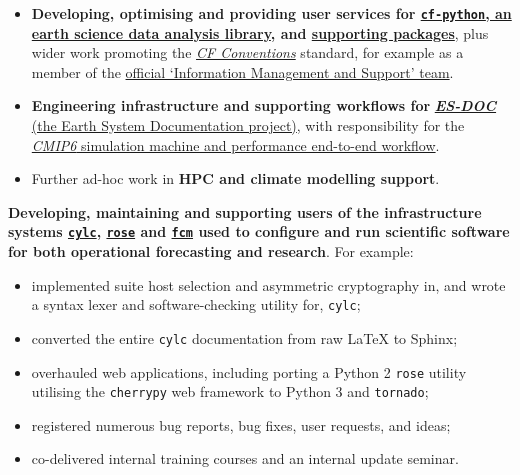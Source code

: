 \documentclass[10pt,a4paper]{cv_template}
\begin{document}
\begin{paracol}{2}



\begin{itemize}
  \item \textbf{Developing, optimising and providing user services for \href{https://github.com/NCAS-CMS/cf-python}{\texttt{cf-python}, an earth science data analysis library}, and \href{https://hps.vi4io.org/_media/events/2020/summer-school-cfnetcdf.pdf}{supporting packages}}, plus wider work promoting the \href{https://cfconventions.org/}{\textit{CF Conventions}} standard, for example as a member of the \href{https://cfconventions.org/governance.html}{official `Information Management and Support' team}.
  \item \textbf{Engineering infrastructure and supporting workflows for} \href{https://github.com/ES-DOC/}{\textit{\textbf{ES-DOC}} (the Earth System Documentation project)}, with responsibility for the \href{https://es-doc.org/cmip6-machine-and-performance/}{\textit{CMIP6} simulation machine and performance end-to-end workflow}.
  \item Further ad-hoc work in \textbf{HPC and climate modelling support}.
\end{itemize}

\divider

\textbf{Developing, maintaining and supporting users of the infrastructure systems \href{https://github.com/cylc}{\texttt{cylc}}, \href{https://github.com/metomi/rose}{\texttt{rose}} and \href{https://github.com/metomi/fcm}{\texttt{fcm}} used to configure and run scientific software for both operational forecasting and research}. For example:
\begin{itemize}
  \itemsep0em 
  \item implemented suite host selection and asymmetric cryptography in, and wrote a syntax lexer and software-checking utility for, \texttt{cylc};
  \item converted the entire \texttt{cylc} documentation from raw \LaTeX \hspace{0.1em} to Sphinx;
  \item overhauled web applications, including porting a Python 2 \texttt{rose} utility utilising the \texttt{cherrypy} web framework to Python 3 and \texttt{tornado};
  \item registered numerous bug reports, bug fixes, user requests, and ideas;
  \item co-delivered internal training courses and an internal update seminar.
\end{itemize}



\end{paracol}
\end{document}
